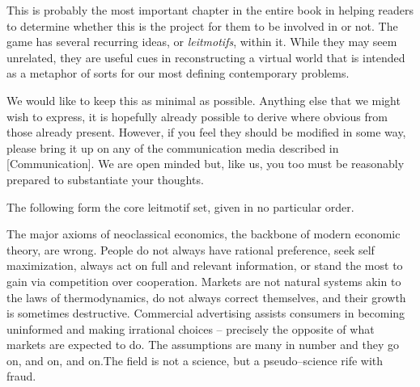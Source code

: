 

This is probably the most important chapter in the entire book in helping readers to determine whether this is the project for them to be involved in or not. The game has several recurring ideas, or {\it leitmotifs}, within it. While they may seem unrelated, they are useful cues in reconstructing a virtual world that is intended as a metaphor of sorts for our most defining contemporary problems.

We would like to keep this  as minimal as possible. Anything else that we might wish to express, it is hopefully already possible to derive where obvious from those already present. However, if you feel they should be modified in some way, please bring it up on any of the communication media described in [Communication]. We are open minded but, like us, you too must be reasonably prepared to substantiate your thoughts.

The following form the core leitmotif set, given in no particular order. 

\startitemize[4]

The major axioms of neoclassical economics, the backbone of modern economic theory, are wrong. People do not always have rational preference, seek self maximization, always act on full and relevant information, or stand the most to gain via competition over cooperation. Markets are not natural systems akin to the laws of thermodynamics, do not always correct themselves, and their growth is sometimes destructive. Commercial advertising assists consumers in becoming uninformed and making irrational choices -- precisely the opposite of what markets are expected to do. The assumptions are many in number and they go on, and on, and on.\footnotecite[lasn2012]\footnotecite[h2oil]\footnotecite[raj2010]\footnotecite[cobb1999]\footnotecite[extras={ See sections 4.6 and 4.11.}][agenda_21] The field is not a science, but a pseudo--science rife with fraud.


